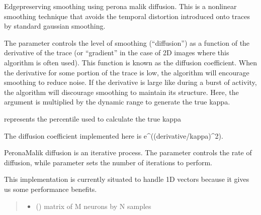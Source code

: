 \documentclass[letterpaper,10pt,english]{sphinxmanual}
\begin{document}
\begin{fulllineitems}
\label{\detokenize{CalSciPy.trace_processing:CalSciPy.trace_processing.perona_malik_diffusion}}
\pysigstartsignatures
{}
\pysigstopsignatures
\sphinxAtStartPar
Edge\sphinxhyphen{}preserving smoothing using perona malik diffusion. This is a non\sphinxhyphen{}linear smoothing technique that avoids the
temporal distortion introduced onto traces by standard gaussian smoothing.

\sphinxAtStartPar
The parameter  controls the level of smoothing (“diffusion”) as a function of the derivative of the trace
(or “gradient” in the case of 2D images where this algorithm is often used). This function is known as the
diffusion coefficient. When the derivative for some portion of the trace is low, the algorithm will encourage
smoothing to reduce noise. If the derivative is large like during a burst of activity, the algorithm will discourage
smoothing to maintain its structure. Here, the argument  is multiplied by the dynamic range to generate the
true kappa.

\sphinxAtStartPar
represents the percentile used to calculate the true
kappa

\sphinxAtStartPar
The diffusion coefficient implemented here is e\textasciicircum{}(\sphinxhyphen{}(derivative/kappa)\textasciicircum{}2).

\sphinxAtStartPar
Perona\sphinxhyphen{}Malik diffusion is an iterative process. The parameter  controls the rate of diffusion, while
parameter  sets the number of iterations to perform.

\sphinxAtStartPar
This implementation is currently situated to handle 1\sphinxhyphen{}D vectors because it gives us some performance benefits.
\begin{quote}\begin{description}
\begin{itemize}
\item {} 
\sphinxAtStartPar
{} () \textendash{} matrix of M neurons by N samples


\end{itemize}
\end{description}
\end{quote}
\end{fulllineitems}
\end{document}

